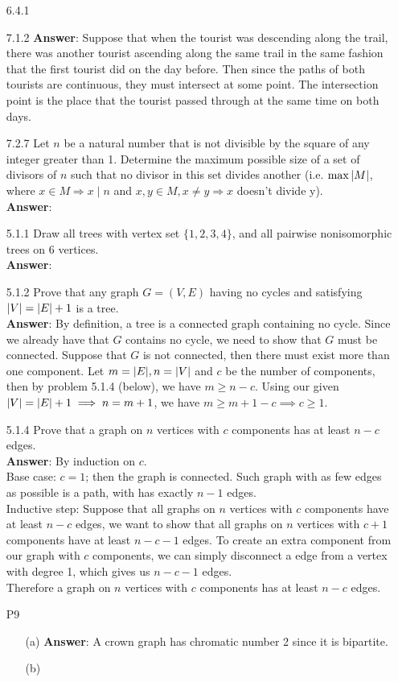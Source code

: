 \documentclass{article}
\title{}
\date{}
\author{Jiaping Zeng}
\begin{document}
\maketitle

\begin{itemize}
    \item [6.4.1]
    \item [7.1.2]
          \textbf{Answer}: Suppose that when the tourist was descending along the trail, there was another tourist ascending along the same trail in the same fashion that the first tourist did on the day before. Then since the paths of both tourists are continuous, they must intersect at some point. The intersection point is the place that the tourist passed through at the same time on both days.
    \item [7.2.7] Let $n$ be a natural number that is not divisible by the square of any integer greater than 1. Determine the maximum possible size of a set of divisors of $n$ such that no divisor in this set divides another (i.e. $\max\abs{M}$, where $x\in M\Rightarrow x\mid n$ and $x,y\in M,x\neq y\Rightarrow x$ doesn't divide y).\\
          \textbf{Answer}:
    \item [5.1.1] Draw all trees with vertex set $\{1,2,3,4\}$, and all pairwise nonisomorphic trees on 6 vertices.\\
          \textbf{Answer}:
    \item [5.1.2] Prove that any graph $G=(V,E)$ having no cycles and satisfying $\abs{V}=\abs{E}+1$ is a tree.\\
          \textbf{Answer}: By definition, a tree is a connected graph containing no cycle. Since we already have that $G$ contains no cycle, we need to show that $G$ must be connected. Suppose that $G$ is not connected, then there must exist more than one component. Let $m=\abs{E}, n=\abs{V}$ and $c$ be the number of components, then by problem 5.1.4 (below), we have $m\geq n-c$. Using our given $\abs{V}=\abs{E}+1\implies n=m+1$, we have $m\geq m+1-c\implies c\geq 1$.
    \item [5.1.4] Prove that a graph on $n$ vertices with $c$ components has at least $n-c$ edges.\\
          \textbf{Answer}: By induction on $c$.\\
          Base case: $c=1$; then the graph is connected. Such graph with as few edges as possible is a path, with has exactly $n-1$ edges.\\
          Inductive step: Suppose that all graphs on $n$ vertices with $c$ components have at least $n-c$ edges, we want to show that all graphs on $n$ vertices with $c+1$ components have at least $n-c-1$ edges. To create an extra component from our graph with $c$ components, we can simply disconnect a edge from a vertex with degree 1, which gives us $n-c-1$ edges.\\
          Therefore a graph on $n$ vertices with $c$ components has at least $n-c$ edges.
    \item [P9]
          \begin{itemize}
              \item [(a)]\textbf{Answer}: A crown graph has chromatic number 2 since it is bipartite.
              \item [(b)]
          \end{itemize}
\end{itemize}
\end{document}
